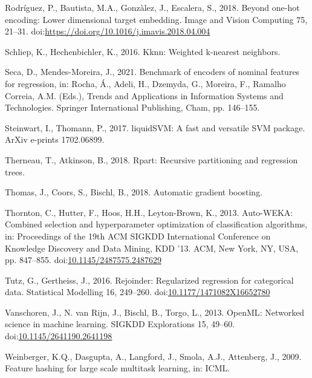 \documentclass[smallextended]{svjour3}       %
\newlength{\cslhangindent}
\newlength{\cslentryspacingunit} %
\newenvironment{CSLReferences}[2] %
 {%
  \setlength{\parindent}{0pt}
  \ifodd #1
  \let\oldpar\par
  \def\par{\hangindent=\cslhangindent\oldpar}
  \fi
  \setlength{\parskip}{#2\cslentryspacingunit}
 }%
 {}
\begin{document}
\begin{CSLReferences}{1}{0}
\leavevmode{}%
Rodríguez, P., Bautista, M.A., Gonzàlez, J., Escalera, S., 2018. Beyond one-hot encoding: Lower dimensional target embedding. Image and Vision Computing 75, 21--31. doi:\url{https://doi.org/10.1016/j.imavis.2018.04.004}

\leavevmode{}%
Schliep, K., Hechenbichler, K., 2016. Kknn: Weighted k-nearest neighbors.

\leavevmode{}%
Seca, D., Mendes-Moreira, J., 2021. Benchmark of encoders of nominal features for regression, in: Rocha, Á., Adeli, H., Dzemyda, G., Moreira, F., Ramalho Correia, A.M. (Eds.), Trends and Applications in Information Systems and Technologies. Springer International Publishing, Cham, pp. 146--155.

\leavevmode{}%
Steinwart, I., Thomann, P., 2017. {liquidSVM}: A fast and versatile SVM package. {ArXiv e-prints 1702.06899}.

\leavevmode{}%
Therneau, T., Atkinson, B., 2018. Rpart: Recursive partitioning and regression trees.

\leavevmode{}%
Thomas, J., Coors, S., Bischl, B., 2018. Automatic gradient boosting.

\leavevmode{}%
Thornton, C., Hutter, F., Hoos, H.H., Leyton-Brown, K., 2013. Auto-WEKA: Combined selection and hyperparameter optimization of classification algorithms, in: Proceedings of the 19th ACM SIGKDD International Conference on Knowledge Discovery and Data Mining, KDD '13. ACM, New York, NY, USA, pp. 847--855. doi:\href{https://doi.org/10.1145/2487575.2487629}{10.1145/2487575.2487629}

\leavevmode{}%
Tutz, G., Gertheiss, J., 2016. Rejoinder: Regularized regression for categorical data. Statistical Modelling 16, 249--260. doi:\href{https://doi.org/10.1177/1471082X16652780}{10.1177/1471082X16652780}

\leavevmode{}%
Vanschoren, J., N. van Rijn, J., Bischl, B., Torgo, L., 2013. {OpenML}: Networked science in machine learning. SIGKDD Explorations 15, 49--60. doi:\href{https://doi.org/10.1145/2641190.2641198}{10.1145/2641190.2641198}

\leavevmode{}%
Weinberger, K.Q., Dasgupta, A., Langford, J., Smola, A.J., Attenberg, J., 2009. Feature hashing for large scale multitask learning, in: ICML.


\end{CSLReferences}
\end{document}
